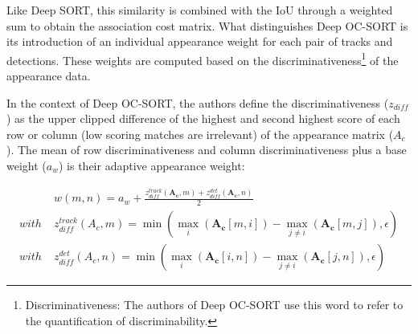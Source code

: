 {
    Like Deep SORT, this similarity is combined with the \ac{IoU} through a weighted sum to obtain the association cost matrix. 
    What distinguishes Deep OC-SORT is its introduction of an individual appearance weight for each pair of tracks and detections. 
    These weights are computed based on the discriminativeness\footnote{Discriminativeness: The authors of Deep OC-SORT use this word to refer to the quantification of discriminability.} of the appearance data.
}

{
    In the context of Deep OC-SORT, the authors define the discriminativeness 
    ($z_{diff}$) as the upper clipped difference of the highest and second highest score of each row or column (low scoring matches are irrelevant) of the appearance matrix ($A_{c}$).
    The mean of row discriminativeness and column discriminativeness plus a base weight ($a_{w}$) is their adaptive appearance weight:
}


\begin{equation}
    \label{eqn:adaptive appearance weight}
    \begin{split}
        &w(m, n) = a_{w} + \frac{z_{diff}^{track}(\mathbf{A_{c}}, m) + z_{diff}^{det}(\mathbf{A_{c}}, n)}{2} \\[0.25cm]
        with \;& z_{diff}^{track}(A_{c}, m) = \min\left( \max_{i} \left( \mathbf{A_{c}}[m, i] \right) - \max_{j \neq i} \left( \mathbf{A_{c}}[m, j] \right), \epsilon \right) \\[0.25cm]
        with \;& z_{diff}^{det}(A_{c}, n) = \min\left( \max_{i} \left( \mathbf{A_{c}}[i, n] \right)  - \max_{j \neq i} \left( \mathbf{A_{c}}[j, n] \right), \epsilon \right)
    \end{split}
\end{equation}

